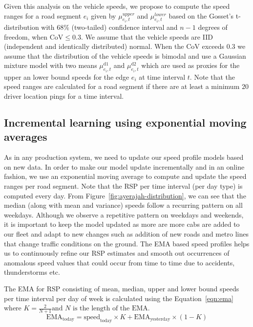 \documentclass[conference]{IEEEtran}
\begin{document}
Given this analysis on the vehicle speeds, we propose to compute the speed ranges for a road segment $e_i$ given by $\mu^{upper}_{e_i,t}$ and  $\mu^{lower}_{e_i,t}$ based on the Gosset's t-distribution with $68\%$ (two-tailed) confidence interval and $n-1$ degrees of freedom, when $\text{CoV}\le 0.3$. We assume that the vehicle speeds are IID (independent and identically distributed) normal. When the \ac{CoV} exceeds $0.3$ we assume that the distribution of the vehicle speeds is bimodal and use a Gaussian mixture model with two means   $\mu_{e_i,t}^{\text{d1}}$ and $\mu_{e_i,t}^{\text{d2}}$ which are used as proxies for the upper an lower bound speeds for the edge $e_i$ at time interval $t$. Note that the speed ranges are calculated for a road segment if there are at least a minimum $20$ driver location pings for a time interval. 



\subsection{Incremental learning using exponential moving averages}
\label{subsec:ema}
As in any production system, we need to update our speed profile models based on new data. In order to make our model update incrementally and in an online fashion, we use an exponential moving average to compute and update the speed ranges per road segment. Note that the \ac{RSP} per time interval (per day type) is computed every day.
From Figure~\ref{fig:ayerajah-distribution}, we can see that the median (along with mean and variance) speeds follow a recurring pattern on all weekdays. Although we observe a repetitive pattern on weekdays and weekends, it is important to keep the model updated as more are more cabs are added to our fleet and adapt to new changes such as addition of new roads and metro lines that change traffic conditions on the ground.
%
The \ac{EMA} based speed profiles helps us to continuously refine our \ac{RSP} estimates and  smooth out occurrences of anomalous speed values that could occur from time to time due to accidents, thunderstorms etc.



The \ac{EMA} for \ac{RSP} consisting of mean, median, upper and lower bound speeds per time interval per day of week is calculated using the Equation~\ref{eqn:ema} where $K=\frac{2}{N+1} \text{and } N \text{ is the length of the EMA}$.
\begin{equation}
\label{eqn:ema}
    \text{EMA}_\text{today}=\text{speed}_{\text{today}}\times K+\text{EMA}_\text{yesterday}\times(1-K)
\end{equation}
\end{document}
